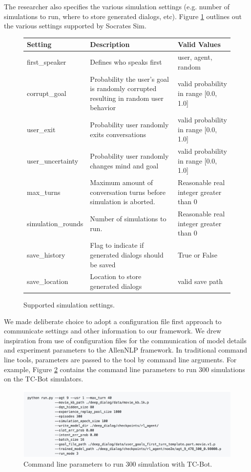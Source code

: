 The researcher also specifies the various simulation settings (e.g. number of simulations to run, where to store generated dialogs, etc). Figure \ref{fig:sim_settings} outlines out the various settings supported by Socrates Sim.

\begin{figure}[h!]
	\centering
	 \begin{tabular}{|l|p{5cm}|p{5cm}|}
		\hline 
		\textbf{Setting} &\textbf{ Description } & \textbf{Valid Values } \\ 
		\hline 
		first\_speaker & Defines who speaks first  & user, agent, random  \\ 
		\hline 
		corrupt\_goal & Probability the user's goal is randomly corrupted resulting in random user behavior  & valid probability in range [0.0, 1.0]  \\ 
		\hline 
		user\_exit & Probability user randomly exits conversations  & valid probability in range [0.0, 1.0]  \\ 
		\hline 
		user\_uncertainty & Probability user randomly changes mind and goal  & valid probability in range [0.0, 1.0]  \\ 
		\hline 
		max\_turns & Maximum amount of conversation turns before simulation is aborted.  &  Reasonable real integer greater than 0 \\ 
		\hline 
		simulation\_rounds & Number of simulations to run.  &  Reasonable real integer greater than 0 \\ 
		\hline 
		save\_history & Flag to indicate if generated dialogs should be saved & True or False  \\ 
		\hline 
		save\_location & Location to store generated dialogs  & valid save path  \\ 
		\hline 
	\end{tabular} 
	\caption{ Supported simulation settings.}
	\label{fig:sim_settings}
\end{figure}

We made deliberate choice to adopt a configuration file first approach to communicate settings and other information to our framework. We drew inspiration from \cite{Gardner_allennlp} use of configuration files for the communication of model details and experiment parameters to the AllenNLP framework. In traditional command line tools, parameters are passed to the tool by command line arguments. For example, Figure \ref{fig:cmd_line_ex} contains the command line parameters to run 300 simulations on the TC-Bot simulators. 

\begin{figure}[h!]
	\centering
	\includegraphics[scale=.25]{diagrams/cmd_line_ex.jpeg}
	\caption{ Command line parameters to run 300 simulation with TC-Bot. }
	\label{fig:cmd_line_ex}
\end{figure}

